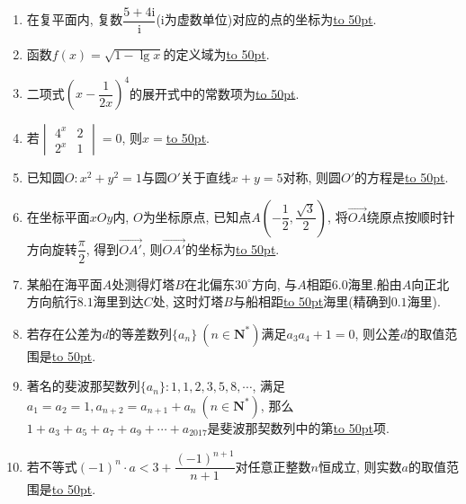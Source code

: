 \documentclass[10pt,a4paper]{article}
\newcommand{\blank}[1]{\underline{\hbox to #1pt{}}}
\begin{document}
\begin{enumerate}[1.]
\item 在复平面内, 复数$\dfrac{5+4\mathrm{i}}{\mathrm{i}}$($\mathrm{i}$为虚数单位)对应的点的坐标为\blank{50}.
\item 函数$f(x)=\sqrt{1-\lg x}$的定义域为\blank{50}.
\item 二项式$(x-\dfrac1{2x})^4$的展开式中的常数项为\blank{50}.
\item 若$\begin{vmatrix} 4^x & 2 \\ 2^x & 1 \end{vmatrix}=0$, 则$x=$\blank{50}.
\item 已知圆$O:x^2+y^2=1$与圆$O'$关于直线$x+y=5$对称, 则圆$O'$的方程是\blank{50}.
\item 在坐标平面$xOy$内, $O$为坐标原点, 已知点$A(-\dfrac12,\dfrac{\sqrt3}2)$, 将$\overrightarrow{OA}$绕原点按顺时针方向旋转$\dfrac{\pi}2$, 得到$\overrightarrow{OA'}$, 则$\overrightarrow{OA'}$的坐标为\blank{50}.
\item 某船在海平面$A$处测得灯塔$B$在北偏东$30^\circ$方向, 与$A$相距$6.0$海里.船由$A$向正北方向航行$8.1$海里到达$C$处, 这时灯塔$B$与船相距\blank{50}海里(精确到$0.1$海里).
\item 若存在公差为$d$的等差数列$\{a_n\} \ (n\in \mathbf{N}^*)$满足$a_3a_4+1=0$, 则公差$d$的取值范围是\blank{50}.
\item 著名的斐波那契数列$\{a_n\}:1,1,2,3,5,8,\cdots$, 满足$a_1=a_2=1,a_{n+2}=a_{n+1}+a_n \ (n\in \mathbf{N}^*)$, 那么$1+a_3+a_5+a_7+a_9+\cdots+a_{2017}$是斐波那契数列中的第\blank{50}项.
\item 若不等式$(-1)^n\cdot a<3+\dfrac{(-1)^{n+1}}{n+1}$对任意正整数$n$恒成立, 则实数$a$的取值范围是\blank{50}.



\end{enumerate}
\end{document}
